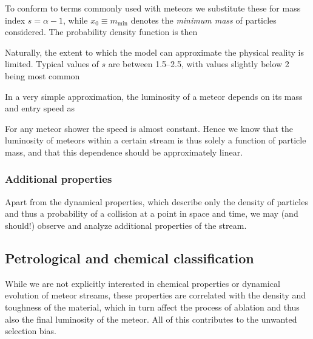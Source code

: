             To conform to terms commonly used with meteors we substitute these for mass index
            $s = \alpha - 1$, while $x_0 \equiv m_\mathrm{min}$ denotes the \emph{minimum mass}
            of particles considered. The probability density function is then

            Naturally, the extent to which the model can approximate the physical reality is limited.
            Typical values of $s$ are between \numrange{1.5}{2.5}, with values slightly below 2 being most common \cite{...}

            In a very simple approximation, the luminosity of a meteor depends on its mass and entry speed as

            For any meteor shower the speed is almost constant. Hence we know that the luminosity of meteors
            within a certain stream is thus solely a function of particle mass, and that this dependence should
            be approximately linear.

        \subsubsection{Additional properties} \label{mpa}
            Apart from the dynamical properties, which describe only the density of particles
            and thus a probability of a collision at a point in space and time,
            we may (and should!) observe and analyze additional properties of the stream.

            \subsection{Petrological and chemical classification} \label{mpac}
                While we are not explicitly interested in chemical properties
                or dynamical evolution of meteor streams, these properties
                are correlated with the density and toughness of the material,
                which in turn affect the process of ablation
                and thus also the final luminosity of the meteor.
                All of this contributes to the unwanted selection bias.

